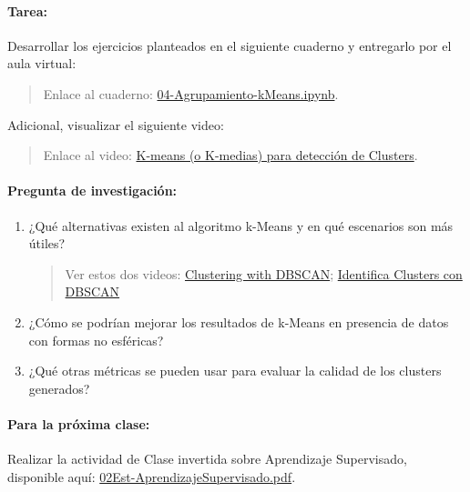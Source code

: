\documentclass[a4,11pt]{aleph-notas}
\begin{document}
\paragraph{Tarea:}
    Desarrollar los ejercicios planteados en el siguiente cuaderno y entregarlo por el aula virtual:
    \begin{quote}
        Enlace al cuaderno: \href{https://colab.research.google.com/github/andres-merino/AprendizajeAutomaticoInicial-05-N0105/blob/main/2-Ejercicios/03-Agrupamiento-Jerarquico.ipynb}{04-Agrupamiento-kMeans.ipynb}.
    \end{quote}
    Adicional, visualizar el siguiente video:
    \begin{quote}
        Enlace al video: \href{https://youtu.be/mICySHB0fh4?si=YuMBh5uQs4xyRt5u}{K-means (o K-medias) para detección de Clusters}.
    \end{quote}


\paragraph{Pregunta de investigación:}  
\begin{enumerate}[leftmargin=*]
    \item ¿Qué alternativas existen al algoritmo k-Means y en qué escenarios son más útiles?
    \begin{quote}
        Ver estos dos videos: \href{https://www.youtube.com/watch?v=RDZUdRSDOok}{Clustering with DBSCAN}; \href{https://www.youtube.com/watch?v=HMis89lGdkA}{Identifica Clusters con DBSCAN}
    \end{quote}
    \item ¿Cómo se podrían mejorar los resultados de k-Means en presencia de datos con formas no esféricas?
    \item ¿Qué otras métricas se pueden usar para evaluar la calidad de los clusters generados?
\end{enumerate}

\paragraph{Para la próxima clase:}  
Realizar la actividad de Clase invertida sobre Aprendizaje Supervisado, disponible aquí: \href{https://andres-merino.github.io/AprendizajeAutomaticoInicial-05-N0105/2-ClaseInvertida/02Est-AprendizajeSupervisado.pdf}{02Est-AprendizajeSupervisado.pdf}.
\end{document}
